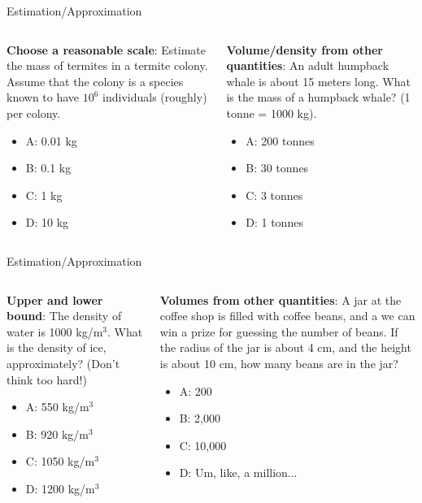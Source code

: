 \documentclass{beamer}
\begin{document}
\begin{frame}{Estimation/Approximation}
\small
\begin{columns}[T]
\begin{column}{0.5\textwidth}
\textbf{Choose a reasonable scale}: Estimate the mass of termites in a termite colony.  Assume that the colony is a species known to have $10^6$ individuals (roughly) per colony.
\begin{itemize}
\item A: 0.01 kg
\item B: 0.1 kg
\item C: 1 kg
\item D: 10 kg
\end{itemize}
\end{column}
\begin{column}{0.5\textwidth}
\textbf{Volume/density from other quantities}: An adult humpback whale is about 15 meters long.  What is the mass of a humpback whale? (1 tonne = 1000 kg).
\vspace{0.55cm}
\begin{itemize}
\item A: 200 tonnes
\item B: 30 tonnes
\item C: 3 tonnes
\item D: 1 tonnes
\end{itemize}
\end{column}
\end{columns}
\end{frame}

\begin{frame}{Estimation/Approximation}
\small
\begin{columns}[T]
\begin{column}{0.5\textwidth}
\textbf{Upper and lower bound}: The density of water is 1000 kg/m$^3$.  What is the density of ice, approximately?  (Don't think too hard!)
\begin{itemize}
\item A: 550 kg/m$^3$
\item B: 920 kg/m$^3$
\item C: 1050 kg/m$^3$
\item D: 1200 kg/m$^3$
\end{itemize}
\end{column}
\begin{column}{0.5\textwidth}
\textbf{Volumes from other quantities}: A jar at the coffee shop is filled with coffee beans, and a we can win a prize for guessing the number of beans.  If the radius of the jar is about 4 cm, and the height is about 10 cm, how many beans are in the jar?
\vspace{0.55cm}
\begin{itemize}
\item A: 200
\item B: 2,000
\item C: 10,000
\item D: Um, like, a million...
\end{itemize}
\end{column}
\end{columns}
\end{frame}
\end{document}
